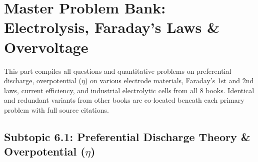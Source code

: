 \chapter{Master Problem Bank: Electrolysis, Faraday's Laws \& Overvoltage}
\label{chap:qb_electrolysis}

\begin{tcolorbox}[enhanced,colback=subtlegold,colframe=accentamber,arc=2mm,boxrule=1pt,
    title=\textbf{\large Part VI Organization: Electrolysis, Faraday's Laws \& Kinetics}]
This part compiles all questions and quantitative problems on preferential discharge, overpotential ($\eta$) on various electrode materials, Faraday's 1st and 2nd laws, current efficiency, and industrial electrolytic cells from all 8 books. Identical and redundant variants from other books are co-located beneath each primary problem with full source citations.
\end{tcolorbox}

\section{Subtopic 6.1: Preferential Discharge Theory \& Overpotential ($\eta$)}

